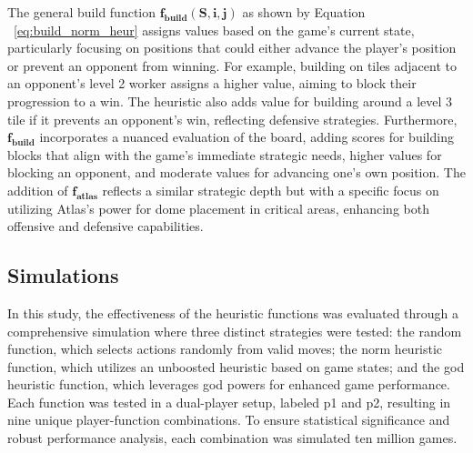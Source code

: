 \documentclass{telkomnika}
\begin{document}
The general build function $\mathbf{f}_{\mathbf{build}}(\mathbf{S}, \mathbf{i}, \mathbf{j})$ as shown by Equation ~\ref{eq:build_norm_heur} assigns values based on the game's current state, particularly focusing on positions that could either advance the player's position or prevent an opponent from winning. For example, building on tiles adjacent to an opponent's level 2 worker assigns a higher value, aiming to block their progression to a win. The heuristic also adds value for building around a level 3 tile if it prevents an opponent's win, reflecting defensive strategies. Furthermore, $\mathbf{f}_{\mathbf{build}}$ incorporates a nuanced evaluation of the board, adding scores for building blocks that align with the game's immediate strategic needs, higher values for blocking an opponent, and moderate values for advancing one's own position. The addition of $\mathbf{f}_{\mathbf{atlas}}$ reflects a similar strategic depth but with a specific focus on utilizing Atlas's power for dome placement in critical areas, enhancing both offensive and defensive capabilities.


\subsection{Simulations}
In this study, the effectiveness of the heuristic functions was evaluated through a comprehensive simulation where three distinct strategies were tested: the random function, which selects actions randomly from valid moves; the norm heuristic function, which utilizes an unboosted heuristic based on game states; and the god heuristic function, which leverages god powers for enhanced game performance. Each function was tested in a dual-player setup, labeled p1 and p2, resulting in nine unique player-function combinations. To ensure statistical significance and robust performance analysis, each combination was simulated ten million games.
\end{document}
